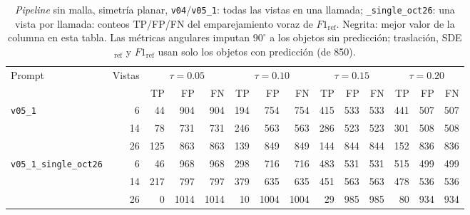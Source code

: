 \begin{table}[htbp]
\centering
\caption{\textit{Pipeline} sin malla, simetría planar, \texttt{v04}/\texttt{v05\_1}: todas las vistas en una llamada; \texttt{\_single\_oct26}: una vista por llamada: conteos TP/FP/FN del emparejamiento voraz de $F1_{\mathrm{ref}}$. Negrita: mejor valor de la columna en esta tabla. Las métricas angulares imputan $90^\circ$ a los objetos sin predicción; traslación, SDE$_{\mathrm{ref}}$ y $F1_{\mathrm{ref}}$ usan solo los objetos con predicción (de 850).}
\label{tab:plane_modo_envio_conteos}
\begin{adjustbox}{max width=\textwidth}
\begin{tabular}{lrrrrrrrrrrrrr}
\toprule
\multirow{2}{*}{Prompt} & \multirow{2}{*}{Vistas} & \multicolumn{3}{c}{$\tau{=}0.05$} & \multicolumn{3}{c}{$\tau{=}0.10$} & \multicolumn{3}{c}{$\tau{=}0.15$} & \multicolumn{3}{c}{$\tau{=}0.20$} \\
\cmidrule(lr){3-5} \cmidrule(lr){6-8} \cmidrule(lr){9-11} \cmidrule(lr){12-14}
 &  & TP & FP & FN & TP & FP & FN & TP & FP & FN & TP & FP & FN \\
\midrule
\multirow{3}{*}{\texttt{v05\_1}} & 6 & 44 & 904 & 904 & 194 & 754 & 754 & 415 & 533 & 533 & 441 & 507 & 507 \\
 & 14 & 78 & 731 & 731 & 246 & 563 & 563 & 286 & 523 & 523 & 301 & 508 & 508 \\
 & 26 & 125 & 863 & 863 & 139 & 849 & 849 & 144 & 844 & 844 & 152 & 836 & 836 \\
\midrule
\multirow{3}{*}{\texttt{v05\_1\_single\_oct26}} & 6 & 46 & 968 & 968 & 298 & 716 & 716 & 483 & 531 & 531 & 515 & 499 & 499 \\
 & 14 & 217 & 797 & 797 & 379 & 635 & 635 & 451 & 563 & 563 & 478 & 536 & 536 \\
 & 26 & 0 & 1014 & 1014 & 10 & 1004 & 1004 & 29 & 985 & 985 & 80 & 934 & 934 \\
\bottomrule
\end{tabular}
\end{adjustbox}
\end{table}
